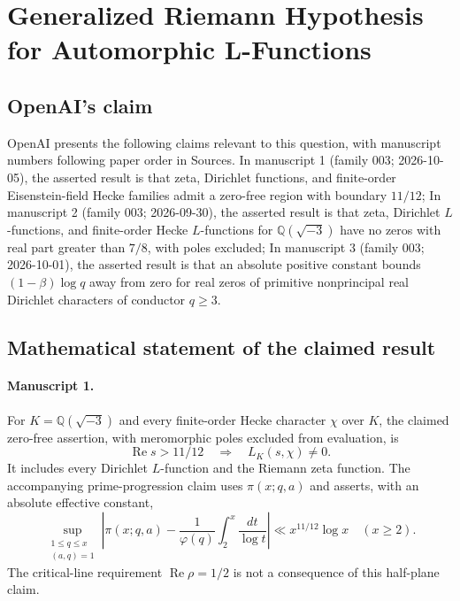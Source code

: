 \documentclass[11pt]{article}
\begin{document}
\section*{Generalized Riemann Hypothesis for Automorphic L-Functions}

\subsection{OpenAI's claim}
OpenAI presents the following claims relevant to this question, with manuscript numbers following paper order in Sources. In manuscript 1 (family 003; 2026-10-05), the asserted result is that zeta, Dirichlet functions, and finite-order Eisenstein-field Hecke families admit a zero-free region with boundary $11/12$; In manuscript 2 (family 003; 2026-09-30), the asserted result is that zeta, Dirichlet $L$-functions, and finite-order Hecke $L$-functions for $\mathbb Q(\sqrt{-3})$ have no zeros with real part greater than $7/8$, with poles excluded; In manuscript 3 (family 003; 2026-10-01), the asserted result is that an absolute positive constant bounds $(1-\beta)\log q$ away from zero for real zeros of primitive nonprincipal real Dirichlet characters of conductor $q\ge3$.

\subsection{Mathematical statement of the claimed result}
\paragraph{Manuscript 1.}
For $K=\mathbb Q(\sqrt{-3})$ and every finite-order Hecke character $\chi$ over $K$, the claimed zero-free assertion, with meromorphic poles excluded from evaluation, is
\[
 \operatorname{Re}s>11/12\quad\Longrightarrow\quad L_K(s,\chi)\ne0.
\]
It includes every Dirichlet $L$-function and the Riemann zeta function. The accompanying prime-progression claim uses $\pi(x;q,a)$ and asserts, with an absolute effective constant,
\[
 \sup_{\substack{1\le q\le x\\(a,q)=1}}
 \left|\pi(x;q,a)-\frac1{\varphi(q)}\int_2^x\frac{dt}{\log t}\right|
 \ll x^{11/12}\log x\quad(x\ge2).
\]
The critical-line requirement $\operatorname{Re}\rho=1/2$ is not a consequence of this half-plane claim.
\end{document}
